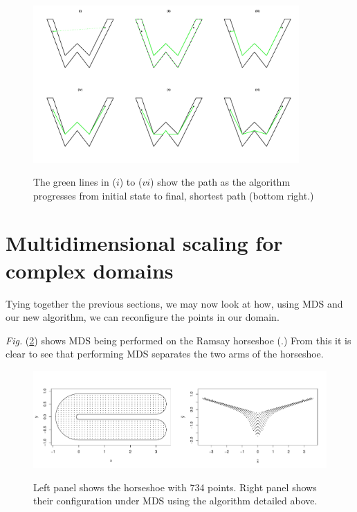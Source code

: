 \documentclass[a4paper,10pt]{amsart}
\newcommand{\Fig}[1]{\emph{Fig.} (\ref{#1})}
\begin{document}
\begin{figure}
\centering
\includegraphics[trim=0in 0.5in 0in 0.25in, width=4in]{figs/wdia.pdf} \\
\caption{The green lines in ($i$) to ($vi$) show the path as the algorithm progresses from initial state to final, shortest path (bottom right.) }
\label{wdia}
\end{figure}





\section{Multidimensional scaling for complex domains}

Tying together the previous sections, we may now look at how, using MDS and our new algorithm, we can reconfigure the points in our domain.

\Fig{ramsay-mds} shows MDS being performed on the Ramsay horseshoe (\cite{ramsay}.) From this it is clear to see that performing MDS separates the two arms of the horseshoe.

\begin{figure}
\centering
\includegraphics[trim=0in 0.5in 0in 0.25in, width=5.5in]{figs/ramsay-mds.pdf} \\
\caption{Left panel shows the horseshoe with 734 points. Right panel shows their configuration under MDS using the algorithm detailed above.}
\label{ramsay-mds}
\end{figure}
\end{document}
